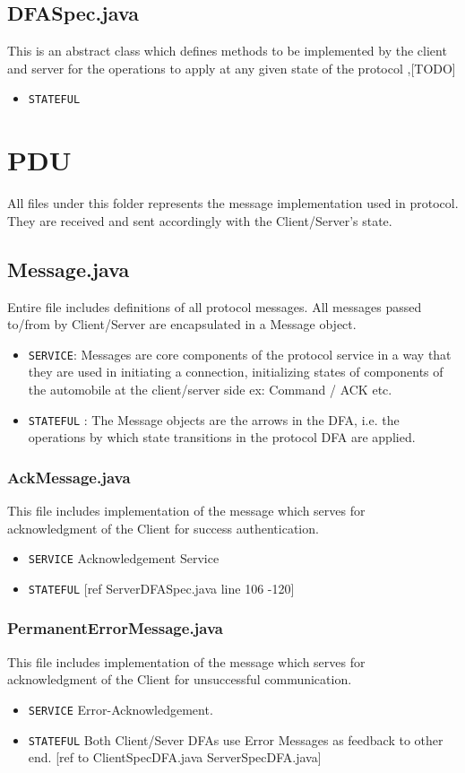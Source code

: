 \documentclass[12pt]{usenixsubmit}
\begin{document}
\subsection{DFASpec.java}This is an abstract class which defines methods to be implemented by the client and server for the operations to apply at any given state of the protocol ,[TODO]
\begin{itemize}
  \item {\tt STATEFUL}
\end{itemize}

  \section{PDU} All files under this folder represents the message implementation used in protocol. They are received and sent accordingly with the Client/Server's state.

     \subsection{Message.java} Entire file includes definitions of all protocol messages. All messages passed to/from by Client/Server are encapsulated in a Message object.
     \begin{itemize}
     \item {\tt SERVICE}:  Messages are core components of the protocol service in a way that they are used in initiating a connection, initializing states of components of the automobile at the client/server side ex: Command / ACK  etc.
     \item {\tt STATEFUL} : The Message objects are the arrows in the DFA, i.e. the operations by which state transitions in the protocol DFA are applied.
     \end{itemize}
\subsubsection{AckMessage.java} This file includes implementation of the message which serves for acknowledgment of the Client for success authentication.
     \begin{itemize}
     \item {\tt SERVICE} Acknowledgement Service
     \item {\tt STATEFUL} [ref ServerDFASpec.java line 106 -120]
     \end{itemize}

     \subsubsection{PermanentErrorMessage.java}This file includes implementation of the message which serves for acknowledgment of the Client for unsuccessful communication.
     \begin{itemize}
     \item {\tt SERVICE}  Error-Acknowledgement.
     \item {\tt STATEFUL} Both Client/Sever DFAs use Error Messages as feedback to other end. [ref to ClientSpecDFA.java ServerSpecDFA.java]
     \end{itemize}
\end{document}
